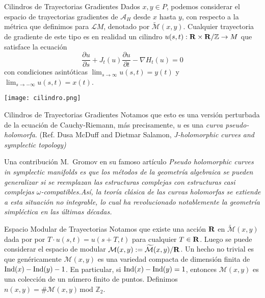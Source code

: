 \documentclass{beamer}
\def\Z{{\mathbb Z}}
\def\R\re
\def \R{{\bf R}}
\def \re{{\mathbb R}}
\begin{document}
\begin{frame}{Cilindros de Trayectorias Gradientes}
    Dados $x, y \in P$, podemos considerar el espacio de trayectorias gradientes de $\mathcal A_H$ desde $x$ hasta $y$, con respecto a la métrica que definimos para $\mathcal LM$,  denotado por $\widetilde{\mathcal M}(x,y)$. \pause Cualquier trayectoria de gradiente de este tipo es en realidad un cilindro $u(s,t): \R \times \R/\Z \to M$ que satisface la ecuación
\[
\frac{\partial u}{\partial s} + J_t(u) \frac{\partial u}{\partial t} - \nabla H_t(u) = 0
\]
con condiciones asintóticas $\lim_{s \to \infty} u(s,t) = y(t)$ y $\lim_{s \to -\infty} u(s,t) = x(t)$. \pause

    \begin{center}
    \texttt{[image: cilindro.png]}
\end{center}

\end{frame}

\begin{frame}{Cilindros de Trayectorias Gradientes}
Notamos que esto es una versión perturbada de la ecuación de Cauchy-Riemann, más precisamente, $u$ es una {\it curva pseudo-holomorfa}. (Ref. Dusa McDuff and Dietmar Salamon, \it{J-holomorphic curves and symplectic topology})\pause

Una contribución M.~Gromov en su famoso artículo \it{Pseudo holomorphic curves in symplectic manifolds} es que los métodos de la geometría algebraica se pueden generalizar si se reemplazan las estructuras complejas con estructuras casi complejas $\omega$-compatibles.\pause Así, la teoría clásica de las curvas holomorfas se extiende a esta situación no integrable, lo cual ha revolucionado notablemente la geometría simpléctica en las últimas décadas.


\end{frame}


\begin{frame}{Espacio Modular de Trayectorias}
Notamos que existe una acción $\R$ en $\widetilde{\mathcal M}(x,y)$ dada por por $T \cdot u(s,t) = u(s+T,t)$ para cualquier $T \in \R$. \pause Luego se puede considerar el espacio de modular $\mathcal M(x,y) : = \widetilde{\mathcal M}(x,y)/\R$. \pause Un hecho no trivial es que genéricamente $\mathcal M(x,y)$ es una variedad compacta de dimensión finita de ${\rm Ind}(x) - {\rm Ind}(y)-1$. \pause En particular, si ${\rm Ind}(x) - {\rm Ind}(y) = 1$, entonces $\mathcal M(x,y)$ es una colección de un número finito de puntos. Definimos $n(x,y) = \# \mathcal M(x,y) \,\mbox{mod $\Z_2$}$.
\end{frame}
\end{document}
